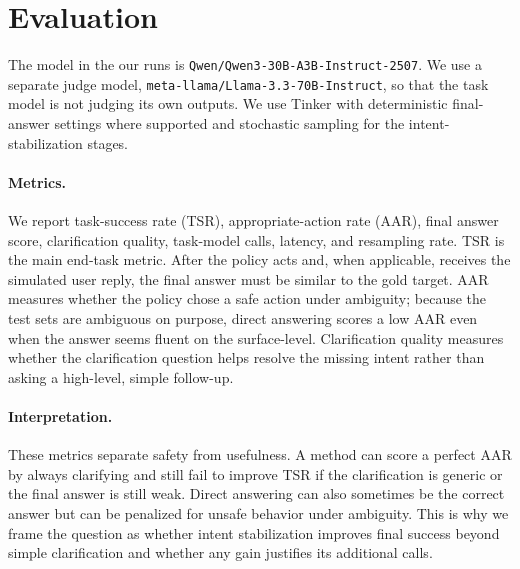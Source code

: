 \section{Evaluation}

The model in the our runs is \texttt{Qwen/Qwen3-30B-A3B-Instruct-2507}. We use a separate judge model, \texttt{meta-llama/Llama-3.3-70B-Instruct}, so that the task model is not judging its own outputs. We use Tinker with deterministic final-answer settings where supported and stochastic sampling for the intent-stabilization stages.

\paragraph{Metrics.}
We report task-success rate (TSR), appropriate-action rate (AAR), final answer score, clarification quality, task-model calls, latency, and resampling rate. TSR is the main end-task metric. After the policy acts and, when applicable, receives the simulated user reply, the final answer must be similar to the gold target. AAR measures whether the policy chose a safe action under ambiguity; because the test sets are ambiguous on purpose, direct answering scores a low AAR even when the answer seems fluent on the surface-level. Clarification quality measures whether the clarification question helps resolve the missing intent rather than asking a high-level, simple follow-up.

\paragraph{Interpretation.}
These metrics separate safety from usefulness. A method can score a perfect AAR by always clarifying and still fail to improve TSR if the clarification is generic or the final answer is still weak. Direct answering can also sometimes be the correct answer but can be penalized for unsafe behavior under ambiguity. This is why we frame the question as whether intent stabilization improves final success beyond simple clarification and whether any gain justifies its additional calls.
